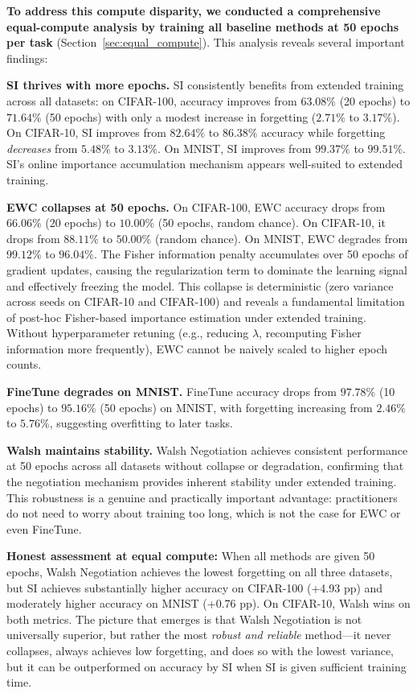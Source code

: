 \documentclass[preprint,review,12pt]{elsarticle}
\begin{document}
\textbf{To address this compute disparity, we conducted a comprehensive equal-compute analysis by training all baseline methods at 50 epochs per task} (Section~\ref{sec:equal_compute}). This analysis reveals several important findings:

\textbf{SI thrives with more epochs.} SI consistently benefits from extended training across all datasets: on CIFAR-100, accuracy improves from $63.08\%$ (20 epochs) to $71.64\%$ (50 epochs) with only a modest increase in forgetting ($2.71\%$ to $3.17\%$). On CIFAR-10, SI improves from $82.64\%$ to $86.38\%$ accuracy while forgetting \emph{decreases} from $5.48\%$ to $3.13\%$. On MNIST, SI improves from $99.37\%$ to $99.51\%$. SI's online importance accumulation mechanism appears well-suited to extended training.

\textbf{EWC collapses at 50 epochs.} On CIFAR-100, EWC accuracy drops from $66.06\%$ (20 epochs) to $10.00\%$ (50 epochs, random chance). On CIFAR-10, it drops from $88.11\%$ to $50.00\%$ (random chance). On MNIST, EWC degrades from $99.12\%$ to $96.04\%$. The Fisher information penalty accumulates over 50 epochs of gradient updates, causing the regularization term to dominate the learning signal and effectively freezing the model. This collapse is deterministic (zero variance across seeds on CIFAR-10 and CIFAR-100) and reveals a fundamental limitation of post-hoc Fisher-based importance estimation under extended training. Without hyperparameter retuning (e.g., reducing $\lambda$, recomputing Fisher information more frequently), EWC cannot be naively scaled to higher epoch counts.

\textbf{FineTune degrades on MNIST.} FineTune accuracy drops from $97.78\%$ (10 epochs) to $95.16\%$ (50 epochs) on MNIST, with forgetting increasing from $2.46\%$ to $5.76\%$, suggesting overfitting to later tasks.

\textbf{Walsh maintains stability.} Walsh Negotiation achieves consistent performance at 50 epochs across all datasets without collapse or degradation, confirming that the negotiation mechanism provides inherent stability under extended training. This robustness is a genuine and practically important advantage: practitioners do not need to worry about training too long, which is not the case for EWC or even FineTune.

\textbf{Honest assessment at equal compute:} When all methods are given 50 epochs, Walsh Negotiation achieves the lowest forgetting on all three datasets, but SI achieves substantially higher accuracy on CIFAR-100 (+4.93 pp) and moderately higher accuracy on MNIST (+0.76 pp). On CIFAR-10, Walsh wins on both metrics. The picture that emerges is that Walsh Negotiation is not universally superior, but rather the most \emph{robust and reliable} method---it never collapses, always achieves low forgetting, and does so with the lowest variance, but it can be outperformed on accuracy by SI when SI is given sufficient training time.
\end{document}
